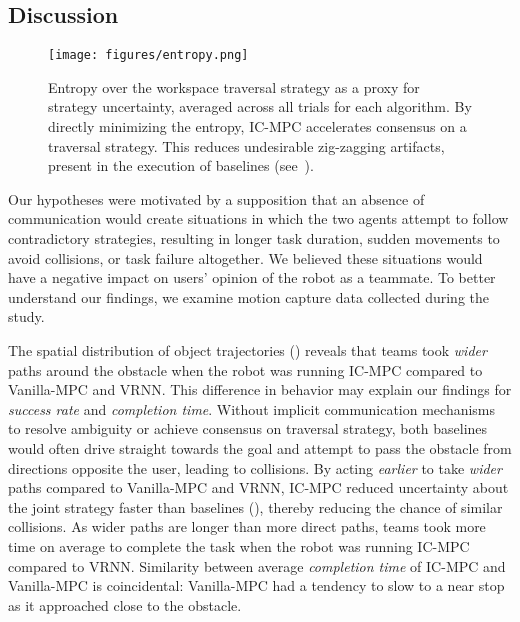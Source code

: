 \subsection{Discussion}

\begin{figure}
    \centering
    \texttt{[image: figures/entropy.png]}
    \caption{Entropy over the workspace traversal strategy as a proxy for strategy uncertainty, averaged across all trials for each algorithm. By directly minimizing the entropy, IC-MPC accelerates consensus on a traversal strategy. This reduces undesirable zig-zagging artifacts, present in the execution of baselines (see~).}
    \label{fig:post-hoc-uncertainty}
\end{figure}

Our hypotheses were motivated by a supposition that an absence of communication would create situations in which the two agents attempt to follow contradictory strategies, resulting in longer task duration, sudden movements to avoid collisions, or task failure altogether.
We believed these situations would have a negative impact on users' opinion of the robot as a teammate.
To better understand our findings, we examine motion capture data collected during the study.

The spatial distribution of object trajectories () reveals that teams took \emph{wider} paths around the obstacle when the robot was running IC-MPC compared to Vanilla-MPC and VRNN.
This difference in behavior may explain our findings for \emph{success rate} and \emph{completion time}.
Without implicit communication mechanisms to resolve ambiguity or achieve consensus on traversal strategy, both baselines would often drive straight towards the goal and attempt to pass the obstacle from directions opposite the user, leading to collisions.
By acting \emph{earlier} to take \emph{wider} paths compared to Vanilla-MPC and VRNN, IC-MPC reduced uncertainty about the joint strategy faster than baselines (), thereby reducing the chance of similar collisions.
As wider paths are longer than more direct paths, teams took more time on average to complete the task when the robot was running IC-MPC compared to VRNN.
Similarity between average \emph{completion time} of IC-MPC and Vanilla-MPC is coincidental: Vanilla-MPC had a tendency to slow to a near stop as it approached close to the obstacle.

